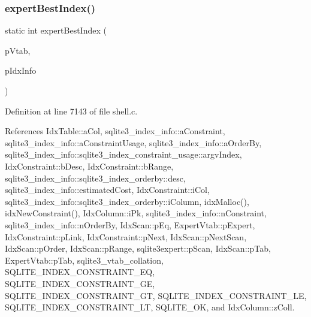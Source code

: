 \mbox{\label{shell_8c_ad313090cadd30bcbabf7a0e2e6f2eff0}} 
\subsubsection{expert\+Best\+Index()}
{\footnotesize\ttfamily static int expert\+Best\+Index (\begin{DoxyParamCaption}\item[{\textbf{ sqlite3\+\_\+vtab} $\ast$}]{p\+Vtab,  }\item[{\textbf{ sqlite3\+\_\+index\+\_\+info} $\ast$}]{p\+Idx\+Info }\end{DoxyParamCaption})\hspace{0.3cm}{\ttfamily [static]}}



Definition at line 7143 of file shell.\+c.



References Idx\+Table\+::a\+Col, sqlite3\+\_\+index\+\_\+info\+::a\+Constraint, sqlite3\+\_\+index\+\_\+info\+::a\+Constraint\+Usage, sqlite3\+\_\+index\+\_\+info\+::a\+Order\+By, sqlite3\+\_\+index\+\_\+info\+::sqlite3\+\_\+index\+\_\+constraint\+\_\+usage\+::argv\+Index, Idx\+Constraint\+::b\+Desc, Idx\+Constraint\+::b\+Range, sqlite3\+\_\+index\+\_\+info\+::sqlite3\+\_\+index\+\_\+orderby\+::desc, sqlite3\+\_\+index\+\_\+info\+::estimated\+Cost, Idx\+Constraint\+::i\+Col, sqlite3\+\_\+index\+\_\+info\+::sqlite3\+\_\+index\+\_\+orderby\+::i\+Column, idx\+Malloc(), idx\+New\+Constraint(), Idx\+Column\+::i\+Pk, sqlite3\+\_\+index\+\_\+info\+::n\+Constraint, sqlite3\+\_\+index\+\_\+info\+::n\+Order\+By, Idx\+Scan\+::p\+Eq, Expert\+Vtab\+::p\+Expert, Idx\+Constraint\+::p\+Link, Idx\+Constraint\+::p\+Next, Idx\+Scan\+::p\+Next\+Scan, Idx\+Scan\+::p\+Order, Idx\+Scan\+::p\+Range, sqlite3expert\+::p\+Scan, Idx\+Scan\+::p\+Tab, Expert\+Vtab\+::p\+Tab, sqlite3\+\_\+vtab\+\_\+collation, S\+Q\+L\+I\+T\+E\+\_\+\+I\+N\+D\+E\+X\+\_\+\+C\+O\+N\+S\+T\+R\+A\+I\+N\+T\+\_\+\+EQ, S\+Q\+L\+I\+T\+E\+\_\+\+I\+N\+D\+E\+X\+\_\+\+C\+O\+N\+S\+T\+R\+A\+I\+N\+T\+\_\+\+GE, S\+Q\+L\+I\+T\+E\+\_\+\+I\+N\+D\+E\+X\+\_\+\+C\+O\+N\+S\+T\+R\+A\+I\+N\+T\+\_\+\+GT, S\+Q\+L\+I\+T\+E\+\_\+\+I\+N\+D\+E\+X\+\_\+\+C\+O\+N\+S\+T\+R\+A\+I\+N\+T\+\_\+\+LE, S\+Q\+L\+I\+T\+E\+\_\+\+I\+N\+D\+E\+X\+\_\+\+C\+O\+N\+S\+T\+R\+A\+I\+N\+T\+\_\+\+LT, S\+Q\+L\+I\+T\+E\+\_\+\+OK, and Idx\+Column\+::z\+Coll.



